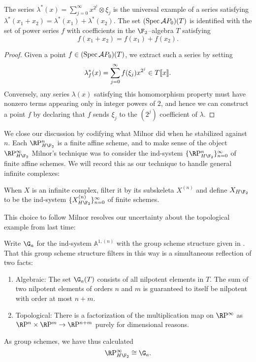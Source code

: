 \begin{lemma}\label{SteenrodAlgIdentifiedWithAutGa}
The series $\lambda^*(x) = \sum_{j=0}^\infty x^{2^j} \otimes \xi_j$ is the universal example of a series satisfying $\lambda^*(x_1 + x_2) = \lambda^*(x_1) + \lambda^*(x_2)$.  The set $(\operatorname{Spec} \mathcal AP_0)(T)$ is identified with the set of power series $f$ with coefficients in the $\F_2$--algebra $T$ satisfying \[f(x_1 + x_2) = f(x_1) + f(x_2).\]
\end{lemma}
\begin{proof}
Given a point $f \in (\operatorname{Spec} \mathcal AP_0)(T)$, we extract such a series by setting \[\lambda^*_f(x) = \sum_{j=0}^\infty f(\xi_j) x^{2^j} \in T\llbracket{x}\rrbracket.\]  Conversely, any series $\lambda(x)$ satisfying this homomorphism property must have nonzero terms appearing only in integer powers of $2$, and hence we can construct a point $f$ by declaring that $f$ sends $\xi_j$ to the $(2^j)${\th} coefficient of $\lambda$.
\end{proof}

We close our discussion by codifying what Milnor did when he stabilized against $n$.  Each $\RP^n_{H\F_2}$ is a finite affine scheme, and to make sense of the object $\RP^\infty_{H\F_2}$ Milnor's technique was to consider the ind-system $\{\RP^n_{H\F_2}\}_{n=0}^\infty$ of finite affine schemes.  We will record this as our technique to handle general infinite complexes:
\begin{definition}\label{FullDefnOfXHF2}
When $X$ is an infinite complex, filter it by its subskeleta $X^{(n)}$ and define $X_{H\F_2}$ to be the ind-system $\{X^{(n)}_{H\F_2}\}_{n=0}^\infty$ of finite schemes.
\end{definition}

This choice to follow Milnor resolves our uncertainty about the topological example from last time:
\begin{example}\label{RPinftyExampleForReal}
Write $\G_a$ for the ind-system $\mathbb A^{1, (n)}$ with the group scheme structure given in .  That this group scheme structure filters in this way is a simultaneous reflection of two facts:
\begin{enumerate}
\item Algebraic: The set $\G_a(T)$ consists of all nilpotent elements in $T$.  The sum of two nilpotent elements of orders $n$ and $m$ is guaranteed to itself be nilpotent with order at most $n+m$.
\item Topological: There is a factorization of the multiplication map on $\RP^\infty$ as $\RP^n \times \RP^m \to \RP^{n+m}$ purely for dimensional reasons.
\end{enumerate}
As group schemes, we have thus calculated \[\RP^\infty_{H\F_2} \cong \G_a.\]
\end{example}

